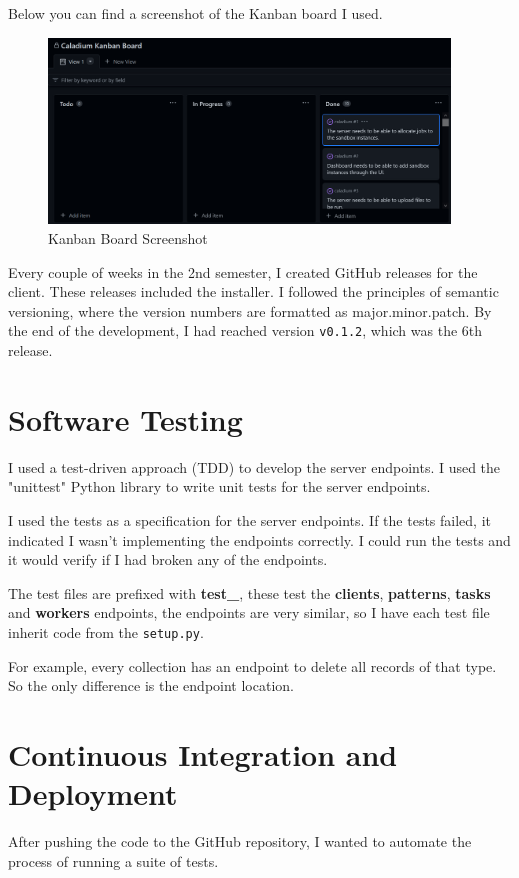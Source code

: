 Below you can find a screenshot of the Kanban board I used.
\begin{figure}[h!]
    \centering
    \label{image:kanbanBoardScreenshot}
    \includegraphics[width=0.95\textwidth]{images/screenshots/kanban_board}
    \caption{Kanban Board Screenshot}
\end{figure}

Every couple of weeks in the 2nd semester,
I created GitHub releases for the client.
These releases included the installer.
I followed the principles of semantic versioning,
where the version numbers are formatted as major.minor.patch.
By the end of the development,
I had reached version \texttt{v0.1.2}, which was the 6th release.

\section{Software Testing}
I used a test-driven approach (TDD) to develop the server endpoints.
I used the "unittest" Python library to write unit tests for the server endpoints.

I used the tests as a specification for the server endpoints.
If the tests failed, it indicated I wasn't implementing the endpoints correctly.
I could run the tests and it would verify if I had broken any of the endpoints.

The test files are prefixed with \textbf{test\_},
these test the \textbf{clients}, \textbf{patterns},
\textbf{tasks} and \textbf{workers} endpoints,
the endpoints are very similar, so I have each test file
inherit code from the \texttt{setup.py}.

For example, every collection has an endpoint to delete all records of that type.
So the only difference is the endpoint location.

\section{Continuous Integration and Deployment}
After pushing the code to the GitHub repository,
I wanted to automate the process of running a suite of tests.

